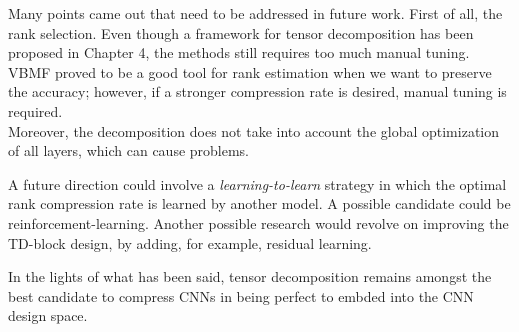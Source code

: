 Many points came out that need to be addressed in future work. First of all, the rank selection. Even though a framework for tensor decomposition has been proposed in Chapter 4, the methods still requires too much manual tuning. VBMF proved to be a good tool for rank estimation when we want to preserve the accuracy; however, if a stronger compression rate is desired, manual tuning is required. \\
Moreover, the decomposition does not take into account the global optimization of all layers, which can cause  problems. 

A future direction could involve a \emph{learning-to-learn} strategy \parencite{learn} in which the optimal rank compression rate is learned by another model. A possible candidate could be reinforcement-learning. 
\newline 
Another possible research would revolve on improving the TD-block design, by adding, for example, residual learning. 

\newline 

In the lights of what has been said, tensor decomposition remains amongst the best candidate to compress CNNs in being perfect to embded into the CNN design space. 

